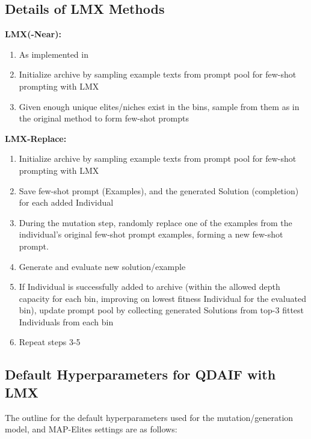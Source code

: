 \subsection{Details of LMX Methods}\label{app:lmx_method}
\textbf{LMX(-Near):}
\begin{enumerate}
    \item As implemented in \cite{meyerson2023language}
    \item Initialize archive by sampling example texts from prompt pool for few-shot prompting with LMX
    \item Given enough unique elites/niches exist in the bins, sample from them as in the original method to form few-shot prompts
\end{enumerate}
\textbf{LMX-Replace:}
\begin{enumerate}
    \item Initialize archive by sampling example texts from prompt pool for few-shot prompting with LMX
    \item Save few-shot prompt (Examples), and the generated Solution (completion) for each added Individual
    \item During the mutation step, randomly replace one of the examples from the individual's original few-shot prompt examples, forming a new few-shot prompt.
    \item Generate and evaluate new solution/example
    \item If Individual is successfully added to archive (within the allowed depth capacity for each bin, improving on lowest fitness Individual for the evaluated bin), update prompt pool by collecting generated Solutions from top-3 fittest Individuals from each bin
    \item Repeat steps 3-5
\end{enumerate}

\clearpage
\newpage
\subsection{Default Hyperparameters for QDAIF with LMX}\label{app:qdaif_lmx}

The outline for the default hyperparameters used for the mutation/generation model, and MAP-Elites settings are as follows:

